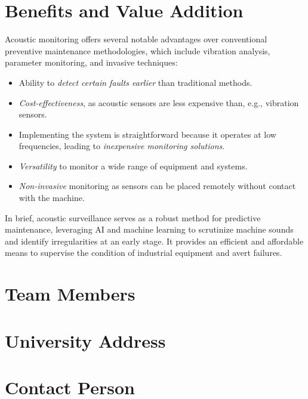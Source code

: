 \documentclass[12pt]{article}
\begin{document}
\section{Benefits and Value Addition}

Acoustic monitoring offers several notable advantages over conventional preventive maintenance methodologies, which include vibration analysis, parameter monitoring, and invasive techniques:
\begin{itemize}
    \item Ability to \textit{detect certain faults earlier} than traditional methods.
    \item \textit{Cost-effectiveness}, as acoustic sensors are less expensive than, e.g., vibration sensors.
    \item Implementing the system is straightforward because it operates at low frequencies, leading to \textit{inexpensive monitoring solutions}.
    \item \textit{Versatility} to monitor a wide range of equipment and systems.
    \item \textit{Non-invasive} monitoring as sensors can be placed remotely without contact with the machine.
\end{itemize}

In brief, acoustic surveillance serves as a robust method for predictive maintenance, leveraging AI and machine learning to scrutinize machine sounds and identify irregularities at an early stage. It provides an efficient and affordable means to supervise the condition of industrial equipment and avert failures.


\section{Team Members}

\section{University Address}

\section{Contact Person}



\end{document}
